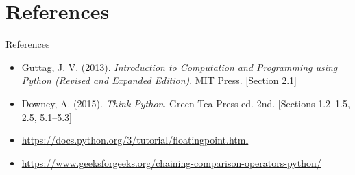 \documentclass[t,handout,9pt]{beamer}
\begin{document}
\section{References}
\begin{frame}{References}
\begin{itemize}
	\item Guttag, J. V. (2013). \textit{Introduction to Computation and Programming using Python (Revised and Expanded Edition)}. MIT Press. [Section 2.1]
	\item Downey, A. (2015). \textit{Think Python}. Green Tea Press ed. 2nd. [Sections 1.2--1.5, 2.5, 5.1--5.3]
	\item \url{https://docs.python.org/3/tutorial/floatingpoint.html}
	\item \url{https://www.geeksforgeeks.org/chaining-comparison-operators-python/}
\end{itemize}
\end{frame}
%

\end{document}
